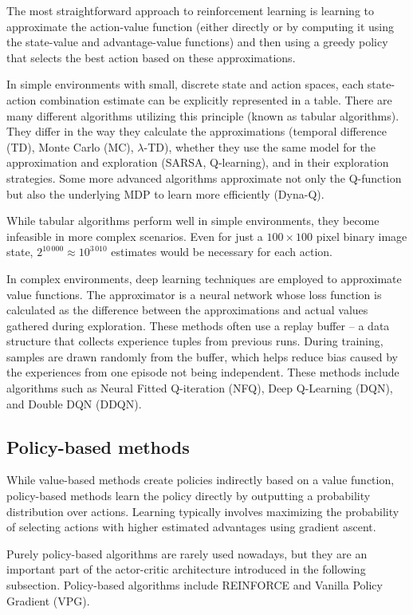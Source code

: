 \documentclass[
  digital,     %
  oneside,     %
  nosansbold,  %
  nocolorbold, %
  lof,         %
  lot,         %
]{fithesis4}
\begin{document}
The most straightforward approach to reinforcement learning is learning to approximate the action-value function (either directly or by computing it using the state-value and advantage-value functions) and then using a greedy policy that selects the best action based on these approximations.

In simple environments with small, discrete state and action spaces, each state-action combination estimate can be explicitly represented in a table. There are many different algorithms utilizing this principle (known as tabular algorithms). They differ in the way they calculate the approximations (temporal difference (TD), Monte Carlo (MC), $\lambda$-TD), whether they use the same model for the approximation and exploration (SARSA, Q-learning), and in their exploration strategies. Some more advanced algorithms approximate not only the Q-function but also the underlying MDP to learn more efficiently (Dyna-Q).

While tabular algorithms perform well in simple environments, they become infeasible in more complex scenarios. Even for just a $100 \times 100$ pixel binary image state, $2^{10\,000} \approx 10^{3\,010}$ estimates would be necessary for each action.

In complex environments, deep learning techniques are employed to approximate value functions. The approximator is a neural network whose loss function is calculated as the difference between the approximations and actual values gathered during exploration. These methods often use a replay buffer -- a data structure that collects experience tuples from previous runs. During training, samples are drawn randomly from the buffer, which helps reduce bias caused by the experiences from one episode not being independent. These methods include algorithms such as Neural Fitted Q-iteration (NFQ), Deep Q-Learning (DQN), and Double DQN (DDQN).

\subsection{Policy-based methods}

While value-based methods create policies indirectly based on a value function, policy-based methods learn the policy directly by outputting a probability distribution over actions. Learning typically involves maximizing the probability of selecting actions with higher estimated advantages using gradient ascent.

Purely policy-based algorithms are rarely used nowadays, but they are an important part of the actor-critic architecture introduced in the following subsection. Policy-based algorithms include REINFORCE and Vanilla Policy Gradient (VPG).
\end{document}
